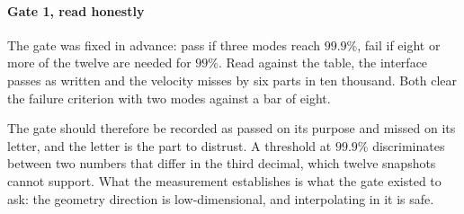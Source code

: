 \documentclass[11pt,a4paper]{article}
\theoremstyle{plain}
\theoremstyle{definition}
\theoremstyle{remark}
\begin{document}
\label{rem:gate1-verdict}
\paragraph{Gate 1, read honestly}
The gate was fixed in advance: pass if three modes reach $99.9\%$, fail if eight
or more of the twelve are needed for $99\%$. Read against the table, the
interface passes as written and the velocity misses by six parts in ten
thousand. Both clear the failure criterion with two modes against a bar of
eight.

The gate should therefore be recorded as passed on its purpose and missed on its
letter, and the letter is the part to distrust. A threshold at $99.9\%$
discriminates between two numbers that differ in the third decimal, which twelve
snapshots cannot support. What the measurement establishes is what the gate
existed to ask: the geometry direction is low-dimensional, and interpolating in
it is safe.



\label{meas:geom-smooth}
\end{document}

